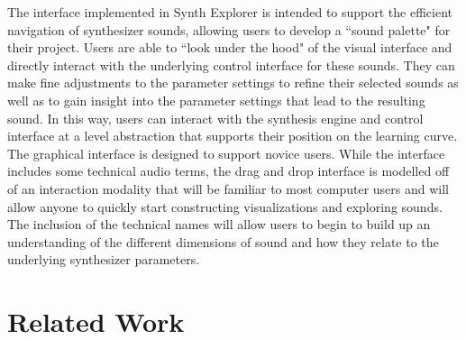 The interface implemented in Synth Explorer is intended to support the efficient navigation of synthesizer sounds, allowing users to develop a ``sound palette" for their project. Users are able to ``look under the hood" of the visual interface and directly interact with the underlying control interface for these sounds. They can make fine adjustments to the parameter settings to refine their selected sounds as well as to gain insight into the parameter settings that lead to the resulting sound. In this way, users can interact with the synthesis engine and control interface at a level abstraction that supports their position on the learning curve. The graphical interface is designed to support novice users. While the interface includes some technical audio terms, the drag and drop interface is modelled off of an interaction modality that will be familiar to most computer users and will allow anyone to quickly start constructing visualizations and exploring sounds. The inclusion of the technical names will allow users to begin to build up an understanding of the different dimensions of sound and how they relate to the underlying synthesizer parameters.

\section{Related Work}

